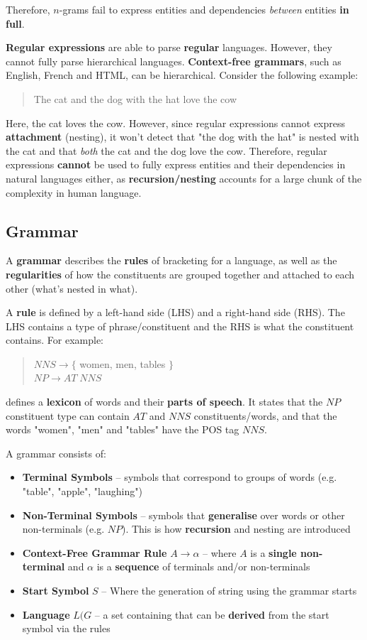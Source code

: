 \documentclass{article}
\begin{document}
Therefore, $n$-grams fail to express entities and dependencies \textit{between} entities \textbf{in full}.

\textbf{Regular expressions} are able to parse \textbf{regular} languages. However, they cannot fully parse hierarchical languages. \textbf{Context-free grammars}, such as English, French and HTML, can be hierarchical.  Consider the following example:
\begin{quote}
	The cat and the dog with the hat love the cow
\end{quote}
Here, the cat loves the cow. However, since regular expressions cannot express \textbf{attachment} (nesting), it won't detect that "the dog with the hat" is nested with the cat and that \textit{both} the cat and the dog love the cow. Therefore, regular expressions \textbf{cannot} be used to fully express entities and their dependencies in natural languages either, as \textbf{recursion/nesting} accounts for a large chunk of the complexity in human language.

\subsection{Grammar}

A \textbf{grammar} describes the \textbf{rules} of bracketing for a language, as well as the \textbf{regularities} of how the constituents are grouped together and attached to each other (what's nested in what).

A \textbf{rule} is defined by a left-hand side (LHS) and a right-hand side (RHS). The LHS contains a type of phrase/constituent and the RHS is what the constituent contains. For example:
\begin{quote}
	$NNS \rightarrow \lbrace$ women, men, tables $\rbrace$ \\
	$NP \rightarrow AT\;NNS$
\end{quote}
defines a \textbf{lexicon} of words and their \textbf{parts of speech}. It states that the $NP$ constituent type can contain $AT$ and $NNS$ constituents/words, and that the words "women", "men" and "tables" have the POS tag $NNS$.

A grammar consists of:
\begin{itemize}
	\item \textbf{Terminal Symbols} -- symbols that correspond to groups of words (e.g. "table", "apple", "laughing")
	\item \textbf{Non-Terminal Symbols} -- symbols that \textbf{generalise} over words or other non-terminals (e.g. $NP$). This is how \textbf{recursion} and nesting are introduced
	\item \textbf{Context-Free Grammar Rule} $A \rightarrow \alpha$ -- where $A$ is a \textbf{single non-terminal} and $\alpha$ is a \textbf{sequence} of terminals and/or non-terminals
	\item \textbf{Start Symbol} $S$ -- Where the generation of string using the grammar starts
	\item \textbf{Language} $L(G$ -- a set containing  that can be \textbf{derived} from the start symbol via the rules
\end{itemize}
\end{document}
